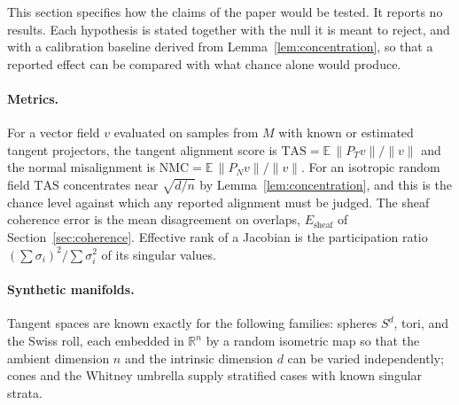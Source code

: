 \documentclass[11pt,a4paper]{article}
\theoremstyle{definition}
\theoremstyle{remark}
\newcommand{\R}{\mathbb{R}}
\begin{document}
This section specifies how the claims of the paper would be tested. It
reports no results. Each hypothesis is stated together with the null it is
meant to reject, and with a calibration baseline derived from
Lemma~\ref{lem:concentration}, so that a reported effect can be compared
with what chance alone would produce.

\paragraph{Metrics.} For a vector field $v$ evaluated on samples from $M$ with
known or estimated tangent projectors, the tangent alignment score is
$\mathrm{TAS}=\mathbb{E}\,\|P_Tv\|/\|v\|$ and the normal misalignment is
$\mathrm{NMC}=\mathbb{E}\,\|P_Nv\|/\|v\|$. For an isotropic random field
$\mathrm{TAS}$ concentrates near $\sqrt{d/n}$ by Lemma~\ref{lem:concentration},
and this is the chance level against which any reported alignment must be
judged. The sheaf coherence error is the mean disagreement on overlaps,
$E_{\mathrm{sheaf}}$ of Section~\ref{sec:coherence}. Effective rank of a
Jacobian is the participation ratio $(\sum\sigma_i)^2/\sum\sigma_i^2$ of its
singular values.

\paragraph{Synthetic manifolds.} Tangent spaces are known exactly for the
following families: spheres $S^d$, tori, and the Swiss roll, each embedded in
$\R^n$ by a random isometric map so that the ambient dimension $n$ and the
intrinsic dimension $d$ can be varied independently; cones and the Whitney
umbrella supply stratified cases with known singular strata.
\end{document}

